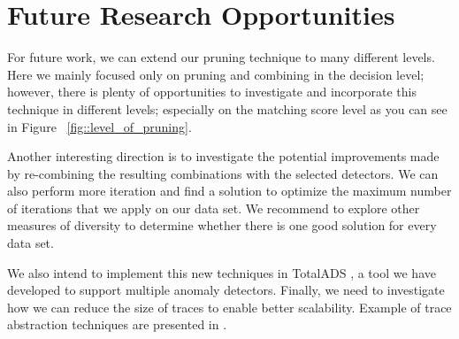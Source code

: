\section{Future Research Opportunities}
\label{sec:future-research}

For future work, we can extend our pruning technique to many different levels. Here we mainly focused only on pruning and combining in the decision level; however, there is plenty of opportunities to investigate and incorporate this technique in different levels; especially on the matching score level as you can see in Figure  ~\ref{fig::level_of_pruning}.

Another interesting direction is to investigate the potential improvements made by re-combining the resulting combinations with the selected detectors. We can also perform more iteration and find a solution to optimize the maximum number of iterations that we apply on our data set. We recommend to explore other measures of diversity to determine whether there is one good solution for every data set.

We also intend to implement this new techniques in TotalADS \cite{Murtaza2014}, a tool we have developed to support multiple anomaly detectors. Finally, we need to investigate how we can reduce the size of traces to enable better scalability. Example of trace abstraction techniques are presented in \cite{Hamou-Lhadj2005,Murtaza2013}.